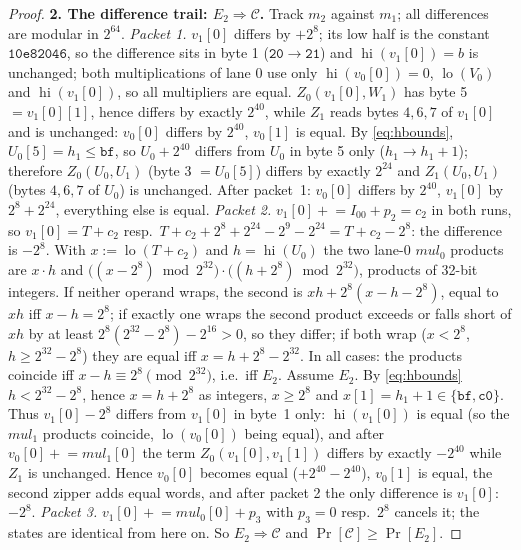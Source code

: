 \begin{proof}
\textbf{2. The difference trail: $E_2\Rightarrow\mathcal C$.}
Track $m_2$ against $m_1$; all differences are modular in $2^{64}$.
\emph{Packet 1.} $v_1[0]$ differs by $+2^{8}$; its low half is the constant $\mathtt{10e82046}$, so the
difference sits in byte 1 ($\mathtt{20}\to\mathtt{21}$) and $\operatorname{hi}(v_1[0])=b$ is unchanged; both
multiplications of lane 0 use only $\operatorname{hi}(v_0[0])=0$, $\operatorname{lo}(V_0)$ and $\operatorname{hi}(v_1[0])$, so all
multipliers are equal. $Z_0(v_1[0],W_1)$ has byte 5 $=v_1[0][1]$, hence differs by exactly $2^{40}$, while
$Z_1$ reads bytes $4,6,7$ of $v_1[0]$ and is unchanged: $v_0[0]$ differs by $2^{40}$, $v_0[1]$ is equal.
By \eqref{eq:hbounds}, $U_0[5]=h_1\le\mathtt{bf}$, so $U_0+2^{40}$ differs from $U_0$ in byte 5 only
($h_1\to h_1+1$); therefore $Z_0(U_0,U_1)$ (byte 3 $=U_0[5]$) differs by exactly $2^{24}$ and $Z_1(U_0,U_1)$
(bytes $4,6,7$ of $U_0$) is unchanged. After packet~1: $v_0[0]$ differs by $2^{40}$, $v_1[0]$ by
$2^{8}+2^{24}$, everything else is equal.
\emph{Packet 2.} $v_1[0]\mathrel{+}=I_{00}+p_2=c_2$ in both runs, so $v_1[0]=T+c_2$ resp.\
$T+c_2+2^{8}+2^{24}-2^{9}-2^{24}=T+c_2-2^{8}$: the difference is $-2^{8}$. With
$x:=\operatorname{lo}(T+c_2)$ and $h=\operatorname{hi}(U_0)$ the two lane-0 $\mathit{mul}_0$ products are
$x\cdot h$ and $\big((x-2^{8})\bmod 2^{32}\big)\cdot\big((h+2^{8})\bmod 2^{32}\big)$, products of 32-bit
integers. If neither operand wraps, the second is $xh+2^{8}(x-h-2^{8})$, equal to $xh$ iff $x-h=2^{8}$;
if exactly one wraps the second product exceeds or falls short of $xh$ by at least $2^{8}(2^{32}-2^{8})-2^{16}>0$,
so they differ; if both wrap ($x<2^{8}$, $h\ge2^{32}-2^{8}$) they are equal iff $x=h+2^{8}-2^{32}$.
In all cases: the products coincide iff $x-h\equiv 2^{8}\pmod{2^{32}}$, i.e.\ iff $E_2$. Assume $E_2$.
By \eqref{eq:hbounds} $h<2^{32}-2^{8}$, hence $x=h+2^{8}$ as integers, $x\ge2^{8}$ and
$x[1]=h_1+1\in\{\mathtt{bf},\mathtt{c0}\}$. Thus $v_1[0]-2^{8}$ differs from $v_1[0]$ in byte~1 only:
$\operatorname{hi}(v_1[0])$ is equal (so the $\mathit{mul}_1$ products coincide, $\operatorname{lo}(v_0[0])$ being equal),
and after $v_0[0]\mathrel{+}=\mathit{mul}_1[0]$ the term $Z_0(v_1[0],v_1[1])$ differs by exactly $-2^{40}$ while
$Z_1$ is unchanged. Hence $v_0[0]$ becomes equal ($+2^{40}-2^{40}$), $v_0[1]$ is equal, the second zipper
adds equal words, and after packet 2 the only difference is $v_1[0]$: $-2^{8}$.
\emph{Packet 3.} $v_1[0]\mathrel{+}=\mathit{mul}_0[0]+p_3$ with $p_3=0$ resp.\ $2^{8}$ cancels it; the
states are identical from here on. So $E_2\Rightarrow\mathcal C$ and $\Pr[\mathcal C]\ge\Pr[E_2]$.


\end{proof}
